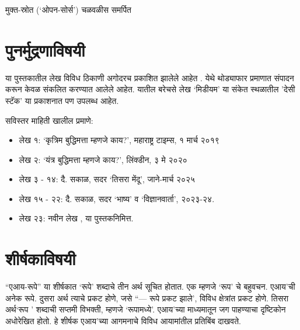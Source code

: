 \begin{dedication}
मुक्त-स्रोत (`ओपन-सोर्स') चळवळीस  समर्पित  
\end{dedication}

\clearpage

\chapter*{पुनर्मुद्रणाविषयी}

या पुस्तकातील लेख विविध ठिकाणी अगोदरच प्रकाशित झालेले आहेत .  येथे थोड्याफार प्रमाणात संपादन करून केवळ संकलित करण्यात आलेले आहेत.  यातील बरेचसे लेख `मिडीयम'  या संकेत स्थळातील 'देसी स्टॅक' या प्रकाशनात पण उपलब्ध आहेत. 

\vspace{1.5em}
सविस्तर माहिती खालील प्रमाणे:

\begin{itemize}
	\item लेख १: `कृत्रिम बुद्धिमत्ता म्हणजे काय?', महाराष्ट्र टाइम्स, १  मार्च २०१९
	\item  लेख २:  `यंत्र बुद्धिमत्ता म्हणजे काय?',  लिंक्डीन, ३ मे २०२०  
	\item  लेख ३ - १४: दै. सकाळ,  सदर `तिसरा मेंदू', जाने-मार्च २०२५
	\item  लेख १५ - २२: दै. सकाळ, सदर `भाष्य' व `विज्ञानवार्ता', २०२३-२४. 
	\item  लेख २३:   नवीन लेख ,  या पुस्तकनिमित्त. 
\end{itemize}


\chapter*{शीर्षकाविषयी }

``एआय-रूपे'' या शीर्षकात `रूपे' शब्दाचे तीन अर्थ सूचित होतात. एक म्हणजे `रूप' चे बहुवचन. एआय'ची अनेक रूपे. दुसरा अर्थ त्याचे प्रकट होणे, जसे ``--- रूपे प्रकट झाले',  विविध क्षेत्रांत प्रकट होणे. तिसरा अर्थ`रूप '  शब्दाची सप्तमी विभक्ती, म्हणजे `रूपामध्ये'. एआय'च्या माध्यमातून जग पाहण्याचा दृष्टिकोन अधोरेखित होतो. हे शीर्षक एआय'च्या आगमनाचे विविध आयामांतील प्रतिबिंब दाखवते.
